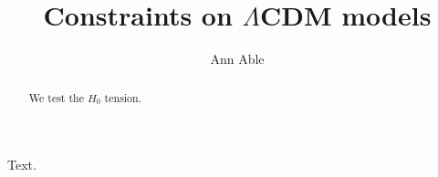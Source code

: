 \documentclass{article}
\title{Constraints on \texorpdfstring{$\Lambda$CDM}{LambdaCDM} models}
\author{Ann Able}
\begin{document}
\maketitle
\begin{abstract}
We test the \texorpdfstring{$H_0$}{Hubble} tension.
\end{abstract}
Text.
\end{document}
